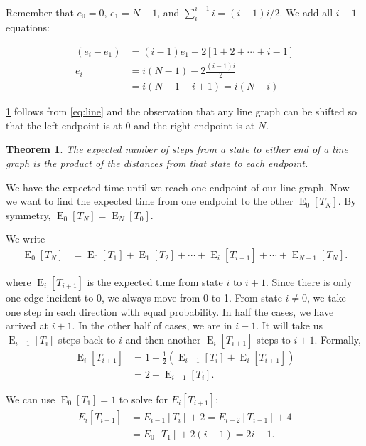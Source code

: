 \documentclass[12pt]{article}
\newtheorem{theorem}{Theorem}
\theoremstyle{definition}
\DeclareMathOperator{\E}{\mathrm{E}}		     %
\begin{document}
Remember that $e_0=0$, $e_1=N-1$, and 
$\sum_{i}^{i-1} i = (i-1)i/2$.
We add all $i-1$ equations:

\begin{align}
(e_i - e_1) &= (i-1) e_1 - 2[1+2+\cdots+i-1] \nonumber \\
e_i &= i(N-1) - 2 \frac{(i-1)i}{2} \nonumber\\
&= i(N-1 - i + 1) = i(N-i)
\label{eq:line}
\end{align}



\cref{thm:line} follows from \cref{eq:line} and the observation that any
line graph can be shifted so that the left endpoint
is at $0$ and the right endpoint is at $N$.

\begin{theorem}
The expected number of steps from a state to either end of a line graph
is the product of the distances from that state to each endpoint.
\label{thm:line}
\end{theorem}

We have the expected time until we reach one endpoint of our line graph.
Now we want to find the expected time from one endpoint to the other $\E_0[T_N]$.
By symmetry, $\E_0[T_N] = \E_N[T_0]$.

We write
\begin{align}
\E_0[T_N] &= \E_0[T_1] + \E_1[T_2] + \cdots + \E_{i}[T_{i+1}] + \cdots + \E_{N-1}[T_N]. \nonumber
\end{align}

where $\E_{i}[T_{i+1}]$ is the expected time from state $i$ to $i+1$.
Since there is only one edge incident to 0, we always move from 0 to 1.
From state $i\neq0$, we take one step in each direction with equal probability.
In half the cases, we have arrived at $i+1$.
In the other half of cases, we are in $i-1$.
It will take us $\E_{i-1}[T_i]$ steps back to $i$ and then another
$\E_i[T_{i+1}]$ steps to $i+1$.
Formally,
\begin{align}
\E_{i}[T_{i+1}] &= 1 + \frac{1}{2}(\E_{i-1}[T_i]+\E_i[T_{i+1}]) \nonumber \\
 &= 2 + \E_{i-1}[T_{i}]. \nonumber
\end{align}

We can use $\E_0[T_1] = 1$ to solve for $E_i[T_{i+1}]$:
\begin{align}
E_i[T_{i+1}] &= E_{i-1}[T_{i}] + 2 = E_{i-2}[T_{i-1}] + 4 \nonumber\\
 &= E_0[T_1] + 2(i-1) = 2i - 1. \nonumber
\end{align}
\end{document}
